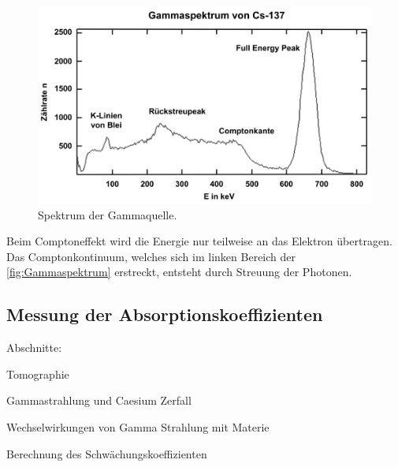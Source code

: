 \begin{figure}[H]
    \centering
    \includegraphics[scale=0.7]{Abbildungen/Gammaspektrum.png}
    \caption{Spektrum der Gammaquelle.\cite{Gammaspektrum}}
    \label{fig:Gammaspektrum}
\end{figure}

Beim Comptoneffekt wird die Energie nur teilweise an das Elektron übertragen. Das Comptonkontinuum, welches sich im linken Bereich der
\autoref{fig:Gammaspektrum} erstreckt, entsteht durch Streuung der Photonen.

\subsection{Messung der Absorptionskoeffizienten}
\label{subsec:Absorptionskoeffizient}



Abschnitte:

Tomographie

Gammastrahlung und Caesium Zerfall

Wechselwirkungen von Gamma Strahlung mit Materie

Berechnung des Schwächungskoeffizienten 



